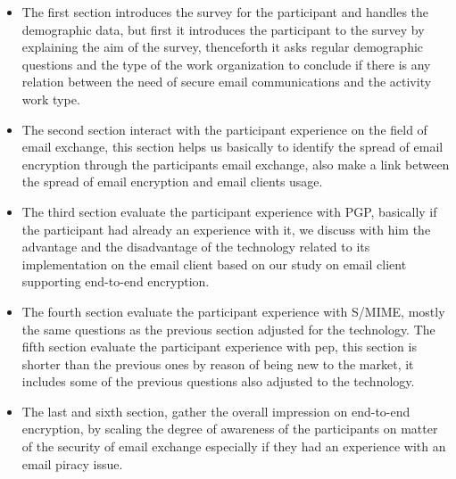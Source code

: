 \begin{itemize}
	\item The first section introduces the survey for the participant and handles the demographic data, but first it introduces the participant to the survey by explaining the aim of the survey, thenceforth it asks regular demographic questions and the type of the work organization to conclude if there is any relation between the need of secure email communications and the activity work type.
	\item The second section interact with the participant experience on the field of email exchange, this section helps us basically to identify the spread of email encryption through the participants email exchange, also make a link between the spread of email encryption and email clients usage.  
	\item The third section evaluate the participant experience with PGP, basically if the participant had already an experience with it, we discuss with him the advantage and the disadvantage of the technology related to its implementation on the email client based on our study on email client supporting end-to-end encryption.
	\item The fourth section evaluate the participant experience with S/MIME, mostly the same questions as the previous section adjusted for the technology.
	The fifth section evaluate the participant experience with pep, this section is shorter than the previous ones by reason of being new to the market, it includes some of the previous questions also adjusted to the technology.
	\item The last and sixth section, gather the overall impression on end-to-end encryption, by scaling the degree of awareness of the participants on matter of the security of email exchange especially if they had an experience with an email piracy issue.
\end{itemize}